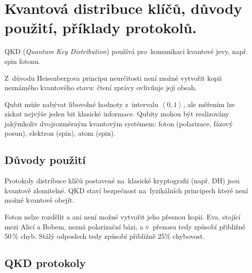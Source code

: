 \clearpage
\section{Kvantová distribuce klíčů, důvody použití, příklady protokolů.}

QKD (\emph{Quantum Key Distribution}) používá pro~komunikaci kvantové jevy, např. spin fotonu.

Z~důvodu Heisenbergova principu neurčitosti není možné vytvořit kopii neznámého kvantového stavu: čtení zprávy ovlivňuje její obsah.

Qubit může nabývat libovolné hodnoty z~intervalu $\left<0,1\right>$, ale měřením lze získat nejvýše jeden bit klasické informace.
Qubity mohou být realizovány jakýmkoliv dvojrozměrným kvantovým systémem: foton (polarizace, fázový posun), elektron (spin), atom (spin).


\subsection{Důvody použití}

Protokoly distribuce klíčů postavené na~klasické kryptografii (např. DH) jsou kvantově zlomitelné.
QKD staví bezpečnost na~fyzikálních principech které není možné kvantově obejít.

Foton nelze rozdělit a ani není možné vytvořit jeho přesnou kopii.
Eva, stojící mezi Alicí a Bobem, nezná polarizační bázi, a v~přenosu tedy způsobí přibližně 50\,\% chyb.
Stálý odposlech tedy způsobí přibližně 25\% chybovost.


\subsection{QKD protokoly}

